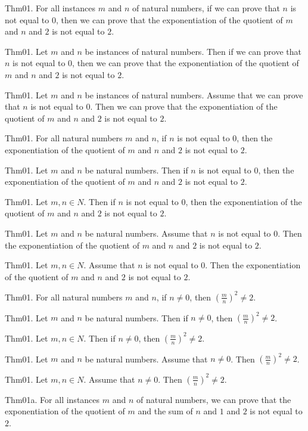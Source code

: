 \documentclass{article}
\begin{document}
Thm01. For all instances $m$ and $n$ of natural numbers, if we can prove that $n$ is not equal to $0$, then we can prove that the exponentiation of the quotient of $m$ and $n$ and $2$ is not equal to $2$.

Thm01. Let $m$ and $n$ be instances of natural numbers. Then if we can prove that $n$ is not equal to $0$, then we can prove that the exponentiation of the quotient of $m$ and $n$ and $2$ is not equal to $2$.

Thm01. Let $m$ and $n$ be instances of natural numbers. Assume that we can prove that $n$ is not equal to $0$. Then we can prove that the exponentiation of the quotient of $m$ and $n$ and $2$ is not equal to $2$.

Thm01. For all natural numbers $m$ and $n$, if $n$ is not equal to $0$, then the exponentiation of the quotient of $m$ and $n$ and $2$ is not equal to $2$.

Thm01. Let $m$ and $n$ be natural numbers. Then if $n$ is not equal to $0$, then the exponentiation of the quotient of $m$ and $n$ and $2$ is not equal to $2$.

Thm01. Let $m , n \in N$. Then if $n$ is not equal to $0$, then the exponentiation of the quotient of $m$ and $n$ and $2$ is not equal to $2$.

Thm01. Let $m$ and $n$ be natural numbers. Assume that $n$ is not equal to $0$. Then the exponentiation of the quotient of $m$ and $n$ and $2$ is not equal to $2$.

Thm01. Let $m , n \in N$. Assume that $n$ is not equal to $0$. Then the exponentiation of the quotient of $m$ and $n$ and $2$ is not equal to $2$.

Thm01. For all natural numbers $m$ and $n$, if $n \neq 0$, then $(\frac{ m}{n})^ {2}\neq 2$.

Thm01. Let $m$ and $n$ be natural numbers. Then if $n \neq 0$, then $(\frac{ m}{n})^ {2}\neq 2$.

Thm01. Let $m , n \in N$. Then if $n \neq 0$, then $(\frac{ m}{n})^ {2}\neq 2$.

Thm01. Let $m$ and $n$ be natural numbers. Assume that $n \neq 0$. Then $(\frac{ m}{n})^ {2}\neq 2$.

Thm01. Let $m , n \in N$. Assume that $n \neq 0$. Then $(\frac{ m}{n})^ {2}\neq 2$.

Thm01a. For all instances $m$ and $n$ of natural numbers, we can prove that the exponentiation of the quotient of $m$ and the sum of $n$ and $1$ and $2$ is not equal to $2$.
\end{document}
